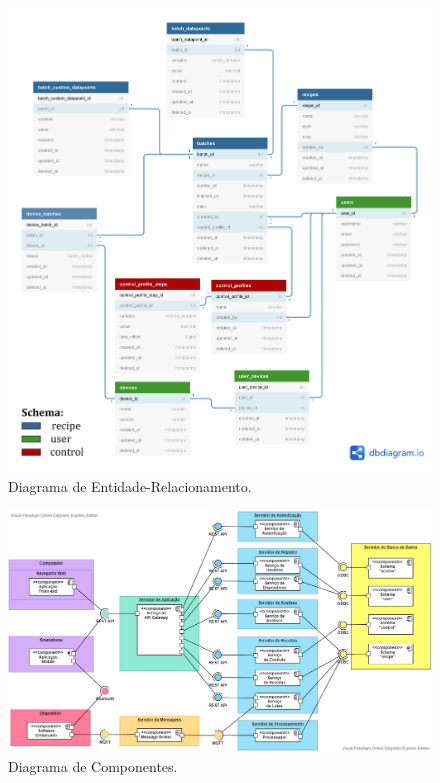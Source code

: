 \begin{figure}[ht]
    \centering
    \includegraphics[scale=0.15]{figuras/projeto/software/banco_de_dados.png}
    \caption{Diagrama de Entidade-Relacionamento.}
    \label{fig:diagrama_entidade_relacionamento}
\end{figure}

\begin{figure}[ht]
    \centering
    \includegraphics[scale=0.50, angle=270]{figuras/projeto/software/diagrama_componentes.png}
    \caption{Diagrama de Componentes.}
    \label{fig:diagrama_componentes}
\end{figure}

